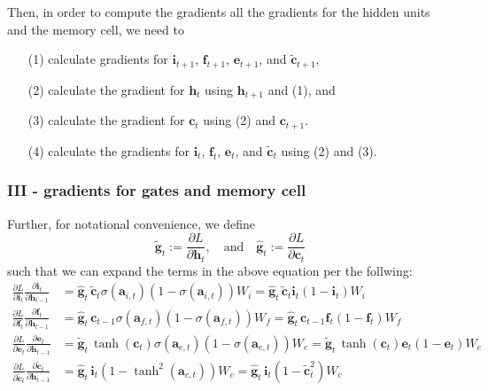 \documentclass{article}
\begin{document}
	Then, in order to compute the gradients all the gradients for the hidden units and the memory cell, we need to 
	\begin{itemize}
		\item[(1)] calculate gradients for $\bm{i}_{t+1}$, $\bm{f}_{t+1}$, $\bm{e}_{t+1}$, and $\tilde{\bm{c}}_{t+1}$,
		\item[(2)] calculate the gradient for $\bm{h}_{t}$ using $\bm{h}_{t+1}$ and (1), and
		\item[(3)] calculate the gradient for $\bm{c}_{t}$ using (2) and $\bm{c}_{t+1}$.
		\item[(4)] calculate the gradients for $\bm{i}_{t}$, $\bm{f}_{t}$, $\bm{e}_{t}$, and $\tilde{\bm{c}}_{t}$ using (2) and (3).
	\end{itemize}

\subsubsection*{III - gradients for gates and memory cell}
	Further, for notational convenience, we define
	$$ \tilde{\bm{g}}_t := \frac{\partial L}{\partial \bm{h}_t}, \quad\text{and}\quad \hat{\bm{g}}_t := \frac{\partial L}{\partial \bm{c}_t}$$
	such that we can expand the terms in the above equation per the follwing:
	\begin{align*}
		\frac{\partial L}{\partial \bm{i}_{t}}\frac{\partial \bm{i}_{t}}{\partial \bm{h}_{t-1}} &= \hat{\bm{g}}_t\,\tilde{\bm{c}}_t \sigma(\bm{a}_{i, t})(1 - \sigma(\bm{a}_{i, t}))W_i = \hat{\bm{g}}_t\,\tilde{\bm{c}}_t \bm{i}_t (1 - \bm{i}_t) W_i\\
		\frac{\partial L}{\partial \bm{f}_{t}}\frac{\partial \bm{f}_{t}}{\partial \bm{h}_{t-1}} &= \hat{\bm{g}}_t\,\bm{c}_{t-1} \sigma(\bm{a}_{f, t})(1 - \sigma(\bm{a}_{f, t}))W_f = \hat{\bm{g}}_t\,\bm{c}_{t-1} \bm{f}_t (1 - \bm{f}_t) W_f\\ 
		\frac{\partial L}{\partial \bm{e}_{t}}\frac{\partial \bm{e}_{t}}{\partial \bm{h}_{t-1}} &=\tilde{\bm{g}}_t\,  \tanh(\bm{c}_t)\sigma(\bm{a}_{e, t})(1 - \sigma(\bm{a}_{e, t}))W_e = \tilde{\bm{g}}_t\,  \tanh(\bm{c}_t)\bm{e}_t(1 - \bm{e}_t)W_e\\ 
		\frac{\partial L}{\partial \tilde{\bm{c}}_{t}}\frac{\partial \tilde{\bm{c}}_{t}}{\partial \bm{h}_{t-1}} &= \hat{\bm{g}}_t\, \bm{i}_t (1 - \tanh^2(\bm{a}_{c, t}))W_c =  \hat{\bm{g}}_t\, \bm{i}_t (1 - \tilde{\bm{c}}_t^2)W_c
	\end{align*}
%
\end{document}
